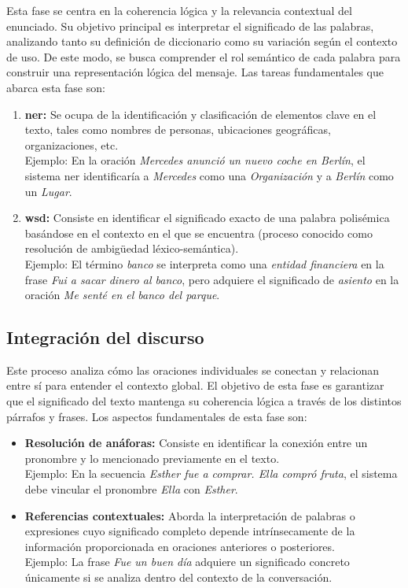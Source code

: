 Esta fase se centra en la coherencia lógica y la relevancia contextual del enunciado. Su objetivo principal es interpretar el significado de las palabras, analizando tanto su definición de diccionario como su variación según el contexto de uso. De este modo, se busca comprender el rol semántico de cada palabra para construir una representación lógica del mensaje. Las tareas fundamentales que abarca esta fase son:

\begin{enumerate}
      \item \textbf{\gls{ner}:} Se ocupa de la identificación y clasificación de elementos clave en el texto, tales como nombres de personas, ubicaciones geográficas, organizaciones, etc.
            \\
            Ejemplo: En la oración \textit{Mercedes anunció un nuevo coche en Berlín}, el sistema \gls{ner} identificaría a \textit{Mercedes} como una \textit{Organización} y a \textit{Berlín} como un \textit{Lugar}.

      \item \textbf{\gls{wsd}:} Consiste en identificar el significado exacto de una palabra polisémica basándose en el contexto en el que se encuentra (proceso conocido como resolución de ambigüedad léxico-semántica).
            \\
            Ejemplo: El término \textit{banco} se interpreta como una \textit{entidad financiera} en la frase \textit{Fui a sacar dinero al banco}, pero adquiere el significado de \textit{asiento} en la oración \textit{Me senté en el banco del parque}.
\end{enumerate}

\subsection{Integración del discurso}

Este proceso analiza cómo las oraciones individuales se conectan y relacionan entre sí para entender el contexto global. El objetivo de esta fase es garantizar que el significado del texto mantenga su coherencia lógica a través de los distintos párrafos y frases. Los aspectos fundamentales de esta fase son:

\begin{itemize}
      \item \textbf{Resolución de anáforas:} Consiste en identificar la conexión entre un pronombre y lo mencionado previamente en el texto.
            \\
            Ejemplo: En la secuencia \textit{Esther fue a comprar. Ella compró fruta}, el sistema debe vincular el pronombre \textit{Ella} con \textit{Esther}.

      \item \textbf{Referencias contextuales:} Aborda la interpretación de palabras o expresiones cuyo significado completo depende intrínsecamente de la información proporcionada en oraciones anteriores o posteriores.
            \\
            Ejemplo: La frase \textit{Fue un buen día} adquiere un significado concreto únicamente si se analiza dentro del contexto de la conversación.
\end{itemize}

